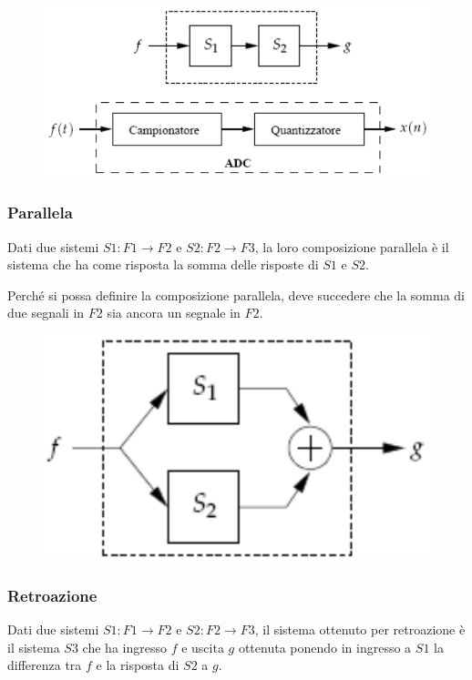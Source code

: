 \begin{figure}[h]
	\centering
	\includegraphics[scale=0.4]{Lezioni/Immagini/cascata}
\end{figure}

\subsubsection{Parallela}
Dati due sistemi $S1 : F1 \rightarrow F2$ e $S2 : F2 \rightarrow F3$, la loro composizione parallela è il sistema che ha come risposta la somma delle risposte di $S1$ e $S2$.

Perché si possa definire la composizione parallela, deve succedere che la somma di due segnali in $F2$ sia ancora un segnale in $F2$.

\begin{figure}[h]
	\centering
	\includegraphics[scale=0.4]{Lezioni/Immagini/parallela}
\end{figure}

\subsubsection{Retroazione}
Dati due sistemi $S1 : F1 \rightarrow F2$ e $S2 : F2 \rightarrow F3$, il sistema ottenuto per retroazione è il sistema $S3$ che ha ingresso $f$ e uscita $g$ ottenuta ponendo in ingresso a $S1$ la differenza tra $f$ e la risposta di $S2$ a $g$.

